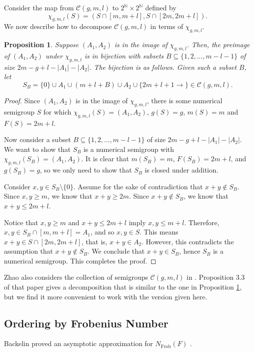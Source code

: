 \documentclass[12pt]{amsart}
\newcommand{\cC}{\mathcal{C}}
\def\N{{\mathbb N}}
\newcommand{\Frob}{\text{Frob}}
\newtheorem{proposition}[theorem]{Proposition}
\begin{document}
Consider the map from $\cC(g,m,l)$ to $2^{\N}\times 2^{\N}$ defined by
\[
\chi_{g,m,l}(S) =\left(S\cap [m,m+l],S\cap [2m,2m+l]\right).
\]
We now describe how to decompose $\cC(g,m,l)$ in terms of $\chi_{g,m,l}$.
\begin{proposition}\label{Prop: parameterize C(g,m,l)}
Suppose $(A_1,A_2)$ is in the image of $\chi_{g,m,l}$. Then, the preimage of $(A_1,A_2)$ under $\chi_{g,m,l}$ is in bijection with subsets $B\subseteq \{1,2,\dots,m-l-1\}$ of size $2m-g+l-|A_1|-|A_2|$. The bijection is as follows.  Given such a subset $B$, let
\[S_B=\{0\}\cup A_1 \cup (m+l+ B)\cup A_2\cup\{2m+l+1\rightarrow\} \in \cC(g,m,l).\]
\end{proposition}
\begin{proof}
Since $(A_1,A_2)$ is in the image of $\chi_{g,m,l}$, there is some numerical semigroup $S$ for which $\chi_{g,m,l}(S)=(A_1,A_2)$, $g(S)=g$, $m(S)=m$ and $F(S)=2m+l$.

Now consider a subset $B\subseteq \{1,2,\dots,m-l-1\}$ of size $2m-g+l-|A_1|-|A_2|$. We want to show that $S_B$ is a numerical semigroup with $\chi_{g,m,l}(S_B)=(A_1,A_2)$.
It is clear that $m(S_B)=m$, $F(S_B)=2m+l$, and $g(S_B)=g$, so we only need to show that $S_B$ is closed under addition. 

Consider $x,y\in S_B\setminus\{0\}$. 
Assume for the sake of contradiction that $x+y\notin S_B$.
Since $x,y\geq m$, we know that $x+y\geq 2m$. Since $x+y\notin S_B$, we know that $x+y\leq 2m+l$.

Notice that $x,y\geq m$ and $x+y\leq 2m+l$ imply $x,y\leq m+l$. Therefore, $x,y\in S_B\cap [m,m+l]=A_1$, and so $x,y\in S$.
This means $x+y\in S\cap [2m,2m+l]$, that is, $x+y\in A_2$. However, this contradicts the assumption that $x+y\notin S_B$.
We conclude that $x+y\in S_B$, hence $S_B$ is a numerical semigroup. This completes the proof.
\end{proof}
Zhao also considers the collection of semigroups $\cC(g,m,l)$ in \cite{zhao2010constructing}.  Proposition 3.3 of that paper gives a decomposition that is similar to the one in Proposition \ref{Prop: parameterize C(g,m,l)}, but we find it more convenient to work with the version given here.



\subsection{Ordering by Frobenius Number}


Backelin proved an asymptotic approximation for $N_{\Frob}(F)$ \cite{backelin1990number}.
\end{document}
